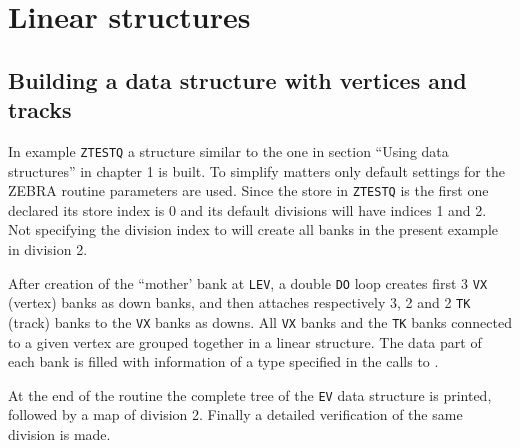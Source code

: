 \section{Linear structures}
\subsection{Building a data structure with vertices and tracks}
\par
In example {\tt ZTESTQ} a structure similar to the one in section ``Using data
structures'' in chapter 1 is built.
To simplify matters only default
settings for the ZEBRA routine parameters are used. Since the store in
{\tt ZTESTQ} is the first one declared its store index is 0 and its default
divisions will have indices 1 and 2. Not specifying the division index
to  will create all banks in the present example in division 2.
\par After creation of the ``mother' bank at {\tt LEV}, 
a double {\tt DO} loop
creates first 3 {\tt VX} (vertex) banks
as down banks, and then attaches respectively 3, 2 and 2 {\tt TK}
(track) banks to the {\tt VX} banks as downs. 
All {\tt VX} banks and the {\tt TK} banks
connected to a given vertex
are grouped together in a linear structure.
The data part of each bank is filled with information of a type specified
in the calls to .
\par At the end of the routine
the complete tree of the {\tt EV} data structure is printed,
followed by a map of division 2. Finally a detailed verification
of the same division is made.
